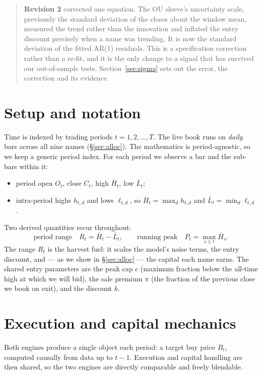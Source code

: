 \documentclass[11pt]{article}
\begin{document}
\begin{quote}
\textbf{Revision 2} corrected one equation. The OU sleeve's uncertainty scale, previously the
standard deviation of the closes about the window mean, measured the trend rather than the
innovation and inflated the entry discount precisely when a name was trending. It is now the
standard deviation of the fitted AR(1) residuals. This is a specification correction rather than
a re-fit, and it is the only change to a signal that has survived our out-of-sample tests.
Section~\ref{sec:sigma} sets out the error, the correction and its evidence.
\end{quote}

\tableofcontents
\newpage

\section{Setup and notation}

Time is indexed by trading periods $t=1,2,\dots,T$. The live book runs on \emph{daily} bars
across all nine names (\S\ref{sec:alloc}). The mathematics is period-agnostic, so we keep a
generic period index. For each period we observe a bar and the sub-bars within it:
\begin{itemize}[topsep=2pt,itemsep=1pt]
\item period open $O_t$, close $C_t$, high $\bar H_t$, low $\bar L_t$;
\item intra-period highs $h_{t,d}$ and lows $\ell_{t,d}$, so $\bar H_t=\max_d h_{t,d}$ and
      $\bar L_t=\min_d \ell_{t,d}$.
\end{itemize}
Two derived quantities recur throughout:
\begin{equation}
\text{period range}\quad R_t=\bar H_t-\bar L_t,\qquad
\text{running peak}\quad P_t=\max_{s\le t}\bar H_s .
\end{equation}
The range $R_t$ is the harvest fuel: it scales the model's noise terms, the entry discount, and
--- as we show in \S\ref{sec:alloc} --- the capital each name earns. The shared entry parameters
are the peak cap $c$ (maximum fraction below the all-time high at which we will bid), the sale
premium $\pi$ (the fraction of the previous close we book on exit), and the discount $k$.

\section{Execution and capital mechanics}

Both engines produce a single object each period: a target buy price $B_t$, computed causally
from data up to $t-1$. Execution and capital handling are then shared, so the two engines are
directly comparable and freely blendable.
\end{document}

